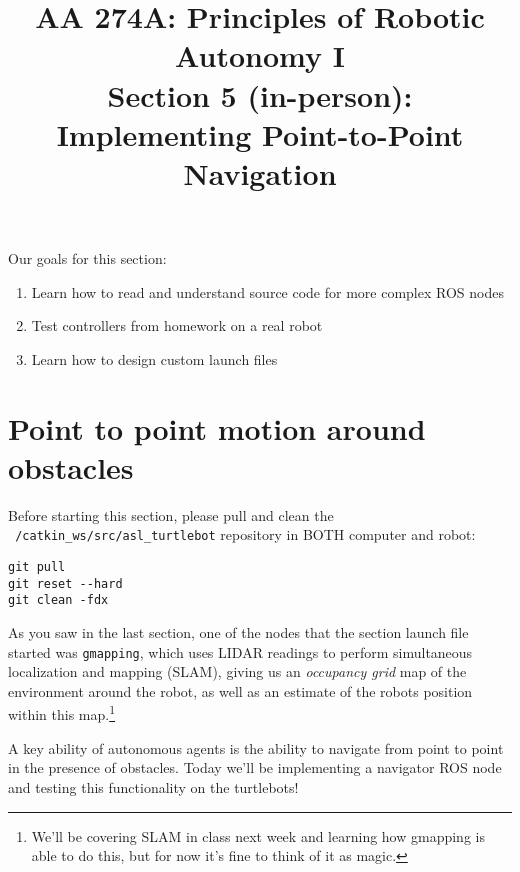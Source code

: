 \documentclass{article}
\title{AA 274A: Principles of Robotic Autonomy I \\Section 5 (in-person): Implementing Point-to-Point Navigation}
\date{}
\begin{document}
\maketitle
\pagestyle{fancy}
\vspace{-1.25cm}
Our goals for this section: 
\begin{enumerate}
    \item Learn how to read and understand source code for more complex ROS nodes
    \item Test controllers from homework on a real robot
    \item Learn how to design custom launch files
\end{enumerate}

\section{Point to point motion around obstacles}
Before starting this section, please pull and clean the \texttt{~/catkin\_ws/src/asl\_turtlebot} repository in BOTH computer and robot:
\begin{lstlisting}
git pull
git reset --hard
git clean -fdx
\end{lstlisting}

As you saw in the last section, one of the nodes that the section launch file started was \texttt{gmapping}, which uses LIDAR readings to perform simultaneous localization and mapping (SLAM), giving us an \textit{occupancy grid} map of the environment around the robot, as well as an estimate of the robots position within this map.\footnote{We'll be covering SLAM in class next week and learning how gmapping is able to do this, but for now it's fine to think of it as magic.}

A key ability of autonomous agents is the ability to navigate from point to point in the presence of obstacles. Today we'll be implementing a navigator ROS node and testing this functionality on the turtlebots!

\end{document}
